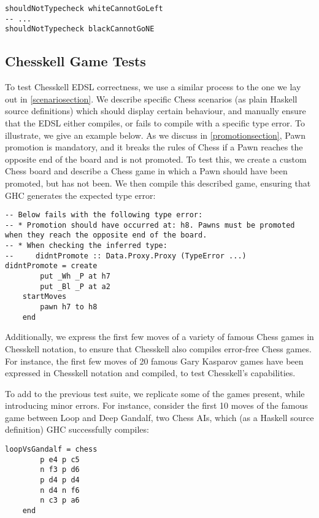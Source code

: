 \begin{lstlisting}
shouldNotTypecheck whiteCannotGoLeft
-- ...
shouldNotTypecheck blackCannotGoNE
\end{lstlisting}

\subsection{Chesskell Game Tests} \label{gametestsection}

To test Chesskell EDSL correctness, we use a similar process to the one we lay out in \cref{scenariosection}. We describe specific Chess scenarios (as plain Haskell source definitions) which should display certain behaviour, and manually ensure that the EDSL either compiles, or fails to compile with a specific type error. To illustrate, we give an example below. As we discuss in \cref{promotionsection}, Pawn promotion is mandatory, and it breaks the rules of Chess if a Pawn reaches the opposite end of the board and is not promoted. To test this, we create a custom Chess board and describe a Chess game in which a Pawn should have been promoted, but has not been. We then compile this described game, ensuring that GHC generates the expected type error:

\begin{lstlisting}
-- Below fails with the following type error:
-- * Promotion should have occurred at: h8. Pawns must be promoted when they reach the opposite end of the board.
-- * When checking the inferred type:
--     didntPromote :: Data.Proxy.Proxy (TypeError ...)
didntPromote = create
        put _Wh _P at h7
        put _Bl _P at a2
    startMoves
        pawn h7 to h8
    end
\end{lstlisting}

Additionally, we express the first few moves of a variety of famous Chess games in Chesskell notation, to ensure that Chesskell also compiles error-free Chess games. For instance, the first few moves of 20 famous Gary Kasparov games have been expressed in Chesskell notation and compiled, to test Chesskell's capabilities.

To add to the previous test suite, we replicate some of the games present, while introducing minor errors. For instance, consider the first 10 moves of the famous game between Loop and Deep Gandalf, two Chess AIs, which (as a Haskell source definition) GHC successfully compiles:

\begin{lstlisting}
loopVsGandalf = chess
        p e4 p c5
        n f3 p d6
        p d4 p d4
        n d4 n f6
        n c3 p a6
    end
\end{lstlisting}

